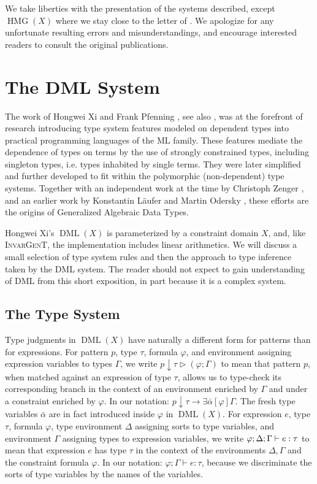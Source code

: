 \documentclass{article}
\newcommand{\tmname}[1]{\textsc{#1}}
\newcommand{\tmop}[1]{\ensuremath{\operatorname{#1}}}
\begin{document}
We take liberties with the presentation of the systems described, except
$\tmop{HMG} (X)$ where we stay close to the letter of
{\cite{simonet-pottier-hmg-toplas}}. We apologize for any unfortunate
resulting errors and misunderstandings, and encourage interested readers to
consult the original publications.

\section{The DML System}\label{DMLSection}

The work of Hongwei Xi and Frank Pfenning {\cite{DML99}}, see also
{\cite{DMLThesis}}, was at the forefront of research introducing type system
features modeled on dependent types into practical programming languages of
the ML family. These features mediate the dependence of types on terms by the
use of strongly constrained types, including singleton types, i.e. types
inhabited by single terms. They were later simplified and further developed to
fit within the polymorphic (non-dependent) type systems. Together with an
independent work at the time by Christoph Zenger {\cite{IndexedTypes}}, and an
earlier work by Konstantin L{\"a}ufer and Martin Odersky {\cite{ExTyADTs}},
these efforts are the origins of Generalized Algebraic Data Types.

Hongwei Xi's $\tmop{DML} (X)$ is parameterized by a constraint domain $X$,
and, like {\tmname{InvarGenT}}, the implementation includes linear
arithmetics. We will discuss a small selection of type system rules and then
the approach to type inference taken by the DML system. The reader should not
expect to gain understanding of DML from this short exposition, in part
because it is a complex system.

\subsection{The Type System}

Type judgments in $\tmop{DML} (X)$ have naturally a different form for
patterns than for expressions. For pattern $p$, type $\tau$, formula
$\varphi$, and environment assigning expression variables to types $\Gamma$,
we write $p \downarrow \tau \vartriangleright (\varphi ; \Gamma)$ to mean that
pattern $p$, when matched against an expression of type $\tau$, allows us to
type-check its corresponding branch in the context of an environment enriched
by $\Gamma$ and under a constraint enriched by $\varphi$. In our notation: $p
\downarrow \tau \longrightarrow \exists \bar{\alpha} [\varphi] \Gamma$. The
fresh type variables $\bar{\alpha}$ are in fact introduced inside $\varphi$ in
$\tmop{DML} (X)$. For expression $e$, type $\tau$, formula $\varphi$, type
environment $\Delta$ assigning sorts to type variables, and environment
$\Gamma$ assigning types to expression variables, we write $\varphi ;
{\nobreak} \Delta ; {\nobreak} \Gamma \vdash e : {\nobreak} \tau$ to mean that
expression $e$ has type $\tau$ in the context of the environments $\Delta,
\Gamma$ and the constraint formula $\varphi$. In our notation: $\varphi ;
\Gamma \vdash e : \tau$, because we discriminate the sorts of type variables
by the names of the variables.
\end{document}
